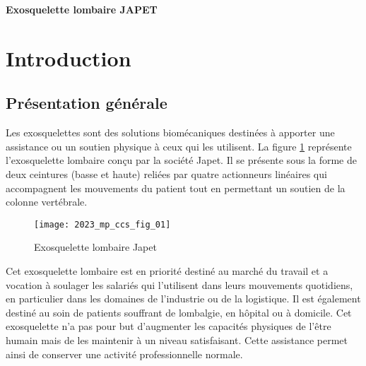 
\begin{center}
\Large\textbf{\textsf{Exosquelette lombaire JAPET}}
\normalsize
\end{center}

%
%
%
%
%




\section{Introduction}
\subsection{Présentation générale} %
Les exosquelettes sont des solutions biomécaniques destinées à apporter une assistance ou un soutien physique à ceux qui les utilisent. La figure \ref{ccs_mp_2023_fig_01} représente l'exosquelette lombaire conçu par la société Japet. Il se présente sous la forme de deux ceintures (basse et haute) reliées par quatre actionneurs linéaires qui accompagnent les mouvements du patient tout en permettant un soutien de la colonne vertébrale.




\begin{figure}[!h]
\centering
\texttt{[image: 2023\_mp\_ccs\_fig\_01]}
\caption{\label{ccs_mp_2023_fig_01}  Exosquelette lombaire Japet}
\end{figure}


Cet exosquelette lombaire est en priorité destiné au marché du travail et a vocation à soulager les salariés qui l'utilisent dans leurs mouvements quotidiens, en particulier dans les domaines de l'industrie ou de la logistique. Il est également destiné au soin de patients souffrant de lombalgie, en hôpital ou à domicile. Cet exosquelette n'a pas pour but d'augmenter les capacités physiques de l'être humain mais de les maintenir à un niveau satisfaisant. Cette assistance permet ainsi de conserver une activité professionnelle normale.

